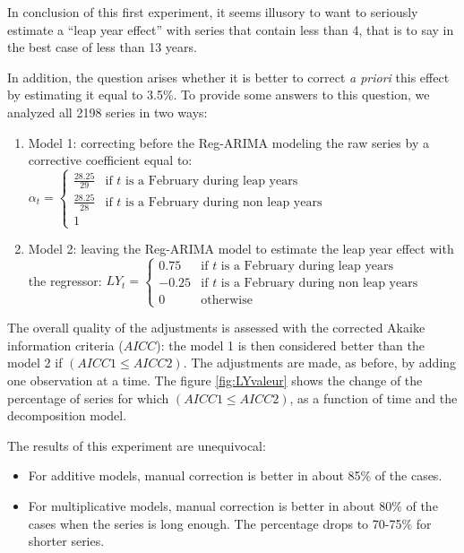 \documentclass[12pt, a4paper]{article}
\begin{document}
\clearpage

In conclusion of this first experiment, it seems illusory to want to seriously estimate a ``leap year effect'' with series that contain less than 4, that is to say in the best case of less than 13 years.

In addition, the question arises whether it is better to correct \emph{a priori} this effect by estimating it equal to 3.5\%. To provide some answers to this question, we analyzed all 2198 series in two ways:
\begin{enumerate}
	\item Model 1: correcting before the Reg-ARIMA modeling the raw series by a corrective coefficient equal to:
$
\alpha_{t} = \left\{ \begin{array}{rl} 
                \frac{28.25}{29} & \mbox{if } t \mbox{ is a February during leap years} \\
                \frac{28.25}{28} & \mbox{if } t \mbox{ is a February during non leap years} \\
                1 & \mbox{}
               \end{array}
         \right.
$
  \item Model 2: leaving the Reg-ARIMA model to estimate the leap year effect with the regressor: $
LY_{t} = \left\{ \begin{array}{rl} 
                0.75 & \mbox{if } t \mbox{ is a February during leap years} \\
                -0.25 & \mbox{if } t \mbox{ is a February during non leap years} \\
                0 & \mbox{otherwise}
               \end{array}
         \right.
$
\end{enumerate}

The overall quality of the adjustments is assessed with the corrected Akaike information criteria ($AICC$): the model 1 is then considered better than the model 2 if $(AICC1 \le AICC2)$. The adjustments are made, as before, by adding one observation at a time.
The figure \ref{fig:LYvaleur} shows the change of the percentage of series for which $(AICC1 \le AICC2)$, as a function of time and the decomposition model.


The results of this experiment are unequivocal:
\begin{itemize}
	\item  For additive models, manual correction is better in about 85\% of the cases.
	\item  For multiplicative models, manual correction is better in about 80\% of the cases when the series is long enough. The percentage drops to 70-75\% for shorter series.
\end{itemize}
\end{document}
